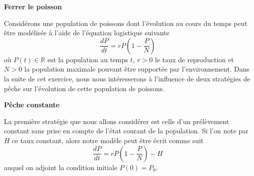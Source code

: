 \documentclass[12pt, answers]{exam}
\begin{document}
\begin{questions}

  \question[10] \textbf{Ferrer le poisson}
  \noaddpoints
  
  Considérons une population de poissons dont l'évolution au cours du temps peut être modélisée à l'aide de l'équation logistique suivante
  \[
  \dfrac{dP}{dt} = r P \left( 1 - \dfrac{P}{N} \right)
  \]
  où $P(t) \in \mathbb{R}$ est la population au temps $t$, $r > 0$ le taux de reproduction et $N > 0$ la population maximale pouvant être supportée par l'environnement.
  Dans la suite de cet exercice, nous nous intéresserons à l'influence de deux stratégies de pêche sur l'évolution de cette population de poissons.

  \textbf{Pêche constante}

  La première stratégie que nous allons considérer est celle d'un prélèvement constant sans prise en compte de l'état  courant de la population.
  Si l'on note par $H$ ce taux constant, alors notre modèle peut être écrit comme suit
  \[
  \dfrac{dP}{dt} = r P \left( 1 - \dfrac{P}{N} \right) - H
  \]
  auquel on adjoint la condition initiale $P(0) = P_0$.

\end{questions}
\end{document}

